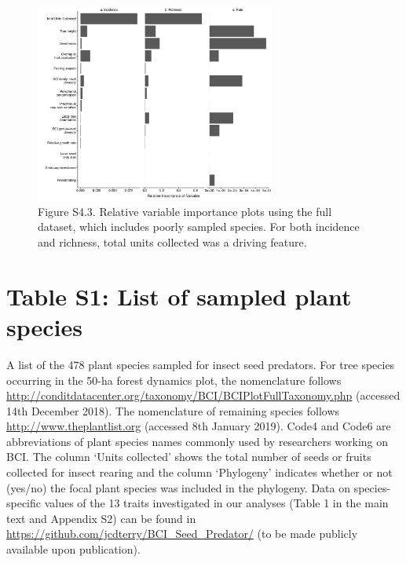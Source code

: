 \documentclass[11pt]{article}
\begin{document}
\begin{figure}[H]
\centering\includegraphics[width=0.7\textwidth]{../Figures/VarImpPlotsall.pdf} 
\caption[]{Figure S4.3. Relative variable importance plots using the full dataset, which includes poorly sampled species. For both incidence and richness, total units collected was a driving feature.  }
\end{figure}




\newpage{}



\section{Table S1: List of sampled plant species} 


A list of the 478 plant species sampled for insect seed predators. For tree species occurring in the 50-ha forest dynamics plot, the nomenclature follows \url{http://conditdatacenter.org/taxonomy/BCI/BCIPlotFullTaxonomy.php} (accessed 14th December 2018). The nomenclature of remaining species follows \url{http://www.theplantlist.org} (accessed 8th January 2019). Code4 and Code6 are abbreviations of plant species names commonly used by researchers working on BCI. The column ‘Units collected’ shows the total number of seeds or fruits collected for insect rearing and the column ‘Phylogeny’ indicates whether or not (yes/no) the focal plant species was included in the phylogeny. Data on species-specific values of the 13 traits investigated in our analyses (Table 1 in the main text and Appendix S2) can be found in \url{https://github.com/jcdterry/BCI_Seed_Predator/} (to be made publicly available upon publication).
\end{document}
